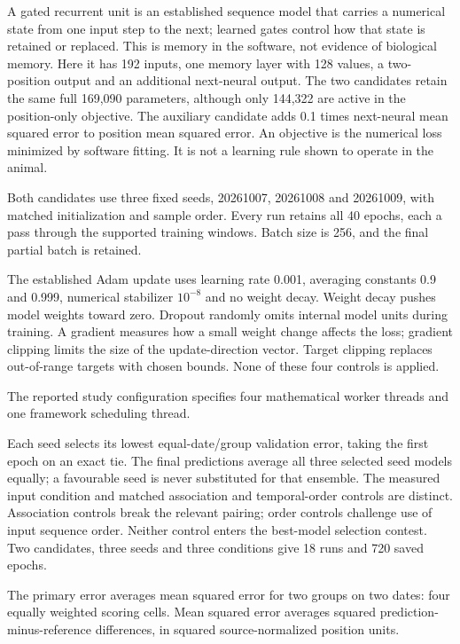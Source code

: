 A gated recurrent unit is an established sequence model that carries a numerical state from one input step to the next; learned gates control how that state is retained or replaced. This is memory in the software, not evidence of biological memory. Here it has 192 inputs, one memory layer with 128
values, a two-position output and an additional next-neural output. The two
candidates retain the same full 169,090 parameters, although only 144,322 are
active in the position-only objective. The auxiliary candidate adds 0.1 times
next-neural mean squared error to position mean squared error. An objective is
the numerical loss minimized by software fitting. It is not a learning rule
shown to operate in the animal.

Both candidates use three fixed seeds, 20261007, 20261008 and 20261009, with matched initialization and sample order. Every run retains all 40 epochs, each a pass through the supported training windows. Batch size is 256, and the final partial batch is retained.

The established Adam update uses learning rate 0.001, averaging constants 0.9 and 0.999, numerical stabilizer $10^{-8}$ and no weight decay. Weight decay pushes model weights toward zero. Dropout randomly omits internal model units during training. A gradient measures how a small weight change affects the loss; gradient clipping limits the size of the update-direction vector. Target clipping replaces out-of-range targets with chosen bounds. None of these four controls is applied.

The reported study configuration specifies four mathematical worker threads and one framework scheduling thread.

Each seed selects its lowest equal-date/group validation error, taking the
first epoch on an exact tie. The final predictions average all three selected
seed models equally; a favourable seed is never substituted for that ensemble.
The measured input condition and matched association and temporal-order
controls are distinct. Association controls break the relevant pairing;
order controls challenge use of input sequence order. Neither control enters
the best-model selection contest. Two candidates, three seeds and three
conditions give 18 runs and 720 saved epochs.

The primary error averages mean squared error for two groups on two dates: four equally weighted scoring cells. Mean squared error averages squared prediction-minus-reference differences, in squared source-normalized position units.

